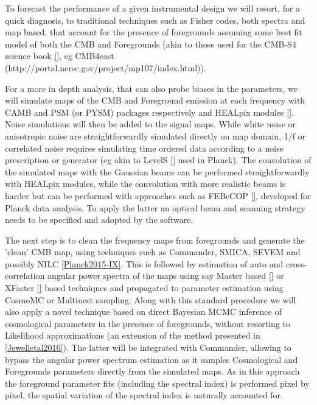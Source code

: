 To forecast the performance of a given instrumental design we will resort, for a quick diagnosis, to traditional techniques such as Fisher codes, both spectra and map based, that account for the presence of foregrounds assuming some best fit model of both the CMB and Foregrounds (akin to those used for the CMB-S4 science book \ref{}, eg CMB4cast (http://portal.nersc.gov/project/mp107/index.html)). 

For a more in depth analysis, that can also probe biases in the parameters, we will simulate maps of the CMB and Foreground emission at each frequency with CAMB and PSM (or PYSM) packages respectively and HEALpix modules \ref{}. Noise simulations will then be added to the signal maps.
While white noise or anisotropic noise are straightforwardly simulated directly on map domain, 1/f or correlated noise requires simulating time ordered data according to a noise prescription or generator (eg akin to LevelS \ref{} used in Planck). The convolution of the simulated maps with the Gaussian beams can be performed straightforwardly with HEALpix modules, while the convolution with more realistic beams is harder but can be performed with approaches such as FEBeCOP \ref{}, developed for Planck data analysis. To apply the latter an optical beam and scanning strategy needs to be specified and adopted by the software.

The next step is to clean the frequency maps from foregrounds and generate the 'clean' CMB map, using techniques such as Commander, SMICA, SEVEM and possibly NILC \ref{Planck2015-IX}. This is followed by estimation of auto and cross-correlation angular power spectra of the maps using say Master based \ref{}  or XFaster \ref{} based techniques and propagated to parameter estimation using CosmoMC or Multinest sampling.
Along with this standard procedure we will also apply a novel technique based on direct Bayesian MCMC inference of cosmological parameters in the presence of foregrounds, without resorting to Likelihood approximations (an extension of the method presented in  \ref{Jewelletal2016}). 
The latter will be integrated with Commander, allowing to bypass the angular power spectrum estimation as it samples Cosmological and Foregrounds parameters directly from the simulated maps. As in this approach the foreground parameter fits (including the spectral index) is performed pixel by pixel, the spatial variation of the spectral index is naturally accounted for. 


